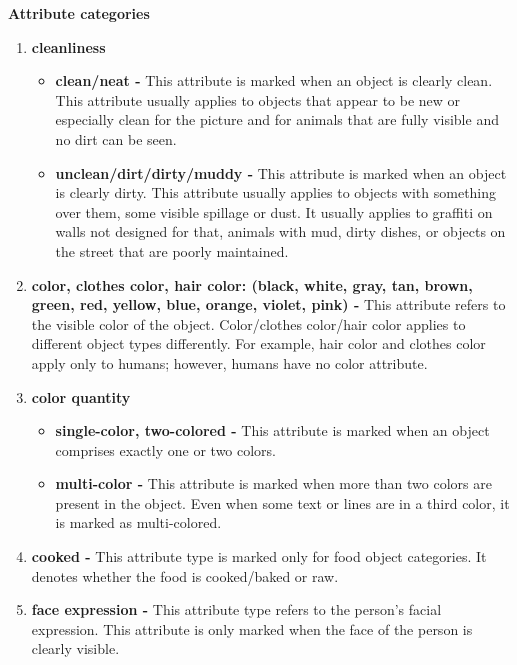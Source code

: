 \documentclass[10pt,twocolumn,letterpaper]{article}
\renewcommand\paragraph[1]{\vspace{0.12cm}\noindent\textbf{#1}}
\begin{document}
\paragraph{Attribute categories}
\begin{enumerate}
    \item \textbf{cleanliness} \begin{itemize}
        \item \textbf{clean/neat -} This attribute is marked when an object is clearly clean. This attribute usually applies to objects that appear to be new or especially clean for the picture and for animals that are fully visible and no dirt can be seen. 
    
        \item \textbf{unclean/dirt/dirty/muddy -} This attribute is marked when an object is clearly dirty. This attribute usually applies to objects with something over them, some visible spillage or dust. It usually applies to graffiti on walls not designed for that, animals with mud, dirty dishes, or objects on the street that are poorly maintained.
    \end{itemize}
    
\item \textbf{color,  clothes color,  hair color: (black, white, gray, tan, brown, green, red, yellow, blue, orange, violet, pink) -} This attribute refers to the visible color of the object. Color/clothes color/hair color applies to different object types differently. For example, hair color and clothes color apply only to humans; however, humans have no color attribute. 
    
\item{\textbf{color quantity}} 
    \begin{itemize}
        \item \textbf{single-color, two-colored -} This attribute is marked when an object comprises exactly one or two colors. 
    
        \item \textbf{multi-color -} This attribute is marked when more than two colors are present in the object. Even when some text or lines are in a third color, it is marked as multi-colored.
    \end{itemize}
    
\item \textbf{cooked -} This attribute type is marked only for food object categories. It denotes whether the food is cooked/baked or raw.
    
\item \textbf{face expression -} This attribute type refers to the person's facial expression. This attribute is only marked when the face of the person is clearly visible.


\end{enumerate}
\end{document}
